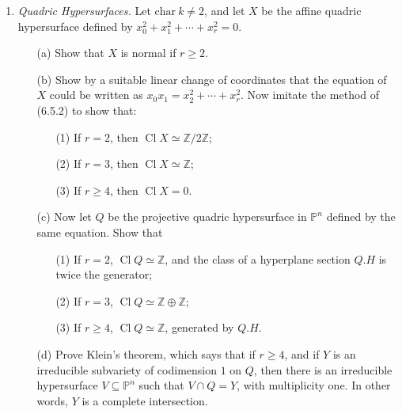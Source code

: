\documentclass{article}
\newcommand{\PP}{\mathbb{P}}
\newcommand{\Z}{\mathbb{Z}}
\DeclareMathOperator{\cl}{Cl}
\begin{document}
\begin{enumerate} [label=\textbf{\arabic*.}, leftmargin=0em]
\begin{proof}
    The quotient field $K$ of $A$ is just $k(x_1, \dots, x_n)[\sqrt{f}]$. It is a Galois extension of $k[x_1, \dots, x_n]$ with Galois group $\Z / 2 \Z$ generated by $\sqrt{f} \mapsto -\sqrt{f}$. It $\alpha = g + h \sqrt{f} \in K$, where $g, h \in k(x_1, \dots, x_n)$, then the minimal polynomial of $\alpha$ is $p_\alpha(X) = X^2 - 2g X + (g^2 - h^2f)$. Suppose $\alpha$ is integral over $k[x_1, \dots, x_n]$. Since $k[x_1, \dots, x_n]$ is integrally closed, the coefficients of $p_\alpha$ lie in $k[x_1, \dots, x_n]$ (A.M. 5.15). It follows $g, h \in k[x_1, \dots, x_n]$. Hence, the integral closure of $k[x_1, \dots, x_n]$ in $K$ lies in $A$. The converse is immediate by the formula for the minimal polynomial of any $\alpha \in K$. Hence, $A$ is an integrally closed ring.
\end{proof}

\item \textit{Quadric Hypersurfaces.} Let $\text{char}~k \neq 2$, and let $X$ be the affine quadric hypersurface defined by $x_0^2 + x_1^2 + \cdots + x_r^2 = 0$.
\begin{itemize}
    \item[(a)] Show that $X$ is normal if $r \geq 2$.
    \item[(b)] Show by a suitable linear change of coordinates that the equation of $X$ could be written as $x_0 x_1 = x_2^2 + \cdots + x_r^2$. Now imitate the method of (6.5.2) to show that:
    \begin{itemize}
        \item[(1)] If $r = 2$, then $\cl X \simeq \Z / 2 \Z$;
        \item[(2)] If $r = 3$, then $\cl X \simeq \Z$;
        \item[(3)] If $r \geq 4$, then $\cl X = 0$.
    \end{itemize}
    \item[(c)] Now let $Q$ be the projective quadric hypersurface in $\PP^n$ defined by the same equation. Show that
    \begin{itemize}
        \item[(1)] If $r = 2$, $\cl Q \simeq \Z$, and the class of a hyperplane section $Q.H$ is twice the generator;
        \item[(2)] If $r = 3$, $\cl Q \simeq \Z \oplus \Z$;
        \item[(3)] If $r \geq 4$, $\cl Q \simeq \Z$, generated by $Q.H$.
    \end{itemize}
    \item[(d)] Prove Klein's theorem, which says that if $r \geq 4$, and if $Y$ is an irreducible subvariety of codimension $1$ on $Q$, then there is an irreducible hypersurface $V \subseteq \PP^n$ such that $V \cap Q = Y$, with multiplicity one. In other words, $Y$ is a complete intersection.
\end{itemize}


\end{enumerate}
\end{document}
